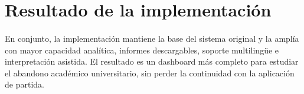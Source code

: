 \section{Resultado de la implementación}

\paragraph*{}
En conjunto, la implementación mantiene la base del sistema original y la amplía con mayor capacidad analítica, informes descargables, soporte multilingüe e interpretación asistida. El resultado es un dashboard más completo para estudiar el abandono académico universitario, sin perder la continuidad con la aplicación de partida.
